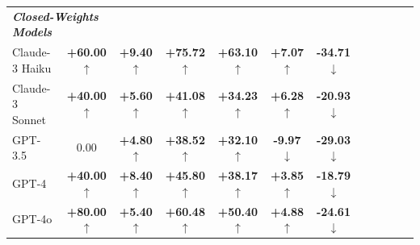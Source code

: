 \documentclass{article}
\newcommand{\gooddelta}[1]{\textcolor{mygreen}{\textbf{+#1} $\uparrow$}}
\newcommand{\baddelta}[1]{\textcolor{myred}{\textbf{#1} $\downarrow$}}
\newcommand{\gooddeltaNeg}[1]{\textcolor{mygreen}{\textbf{#1} $\downarrow$}}
\begin{document}
\begin{table}[h]
\begin{tabular}{lccccccccccc}
\midrule
\multicolumn{2}{l}{\textbf{\textit{Closed-Weights Models}}}  \\
Claude-3 Haiku & \gooddelta{60.00} & \gooddelta{9.40} & \gooddelta{75.72} & \gooddelta{63.10} & \gooddelta{7.07} & \gooddeltaNeg{-34.71} \\
Claude-3 Sonnet & \gooddelta{40.00} & \gooddelta{5.60} & \gooddelta{41.08} & \gooddelta{34.23} & \gooddelta{6.28} & \gooddeltaNeg{-20.93} \\
GPT-3.5 & {0.00} & \gooddelta{4.80} & \gooddelta{38.52} & \gooddelta{32.10} & \baddelta{-9.97} & \gooddeltaNeg{-29.03} \\
GPT-4 & \gooddelta{40.00} & \gooddelta{8.40} & \gooddelta{45.80} & \gooddelta{38.17} & \gooddelta{3.85} & \gooddeltaNeg{-18.79} \\
GPT-4o & \gooddelta{80.00} & \gooddelta{5.40} & \gooddelta{60.48} & \gooddelta{50.40} & \gooddelta{4.88} & \gooddeltaNeg{-24.61} \\
\midrule
\end{tabular}
\end{table}
\end{document}
